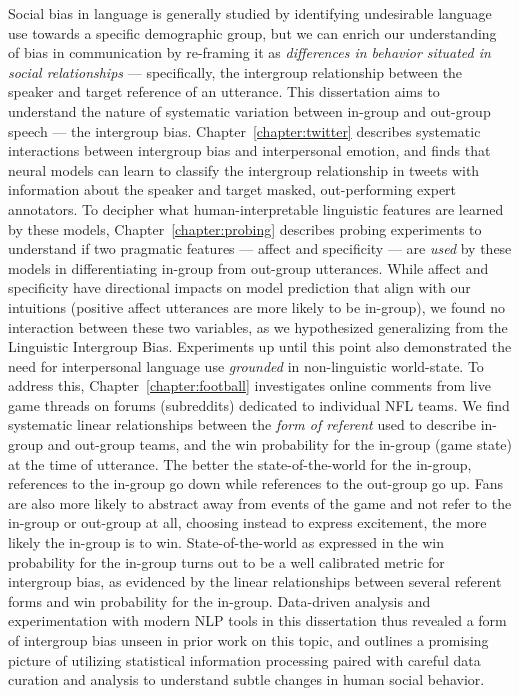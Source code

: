 Social bias in language is generally studied by identifying undesirable language use towards a specific demographic group, but we can enrich our understanding of bias in communication by re-framing it as \emph{differences in behavior situated in social relationships} --- specifically, the intergroup relationship between the speaker and target reference of an utterance. This dissertation aims to understand the nature of systematic variation between in-group and out-group speech --- the intergroup bias. Chapter~\ref{chapter:twitter} describes systematic interactions between intergroup bias and interpersonal emotion, and finds that neural models can learn to classify the intergroup relationship in tweets with information about the speaker and target masked, out-performing expert annotators. To decipher what human-interpretable linguistic features are learned by these models, Chapter~\ref{chapter:probing} describes probing experiments to understand if two pragmatic features --- affect and specificity --- are \emph{used} by these models in differentiating in-group from out-group utterances. While affect and specificity have directional impacts on model prediction that align with our intuitions (positive affect utterances are more likely to be in-group), we found no interaction between these two variables, as we hypothesized generalizing from the Linguistic Intergroup Bias. Experiments up until this point also demonstrated the need for interpersonal language use \emph{grounded} in non-linguistic world-state. To address this, Chapter~\ref{chapter:football} investigates online comments from live game threads on forums (subreddits) dedicated to individual NFL teams. We find systematic linear relationships between the \emph{form of referent} used to describe in-group and out-group teams, and the win probability for the in-group (game state) at the time of utterance. The better the state-of-the-world for the in-group, references to the in-group go down while references to the out-group go up. Fans are also more likely to abstract away from events of the game and not refer to the in-group or out-group at all, choosing instead to express excitement, the more likely the in-group is to win. State-of-the-world as expressed in the win probability for the in-group turns out to be a well calibrated metric for intergroup bias, as evidenced by the linear relationships between several referent forms and win probability for the in-group. Data-driven analysis and experimentation with modern NLP tools in this dissertation thus revealed a form of intergroup bias unseen in prior work on this topic, and outlines a promising picture of utilizing statistical information processing paired with careful data curation and analysis to understand subtle changes in human social behavior.
